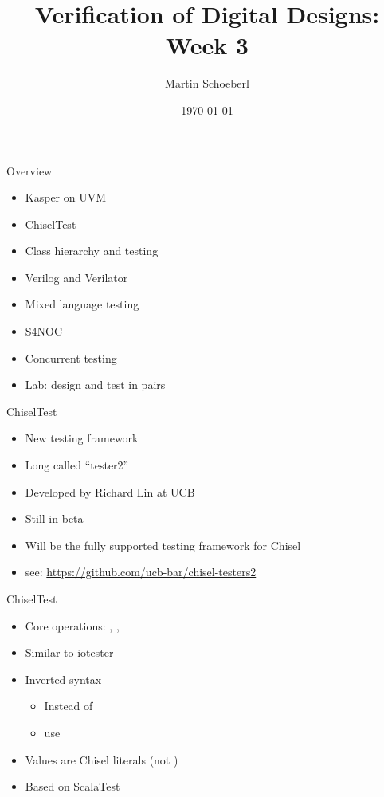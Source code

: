 

\newif\ifbook


\title{Verification of Digital Designs: Week 3}
\author{Martin Schoeberl}
\date{\today}



\begin{frame}
\titlepage
\end{frame}

\begin{frame}[fragile]{Overview}
\begin{itemize}
\item Kasper on UVM
\item ChiselTest
\item Class hierarchy and testing
\item Verilog and Verilator
\item Mixed language testing
\item S4NOC
\item Concurrent testing
\item Lab: design and test in pairs
\end{itemize}
\end{frame}

\begin{frame}[fragile]{ChiselTest}
\begin{itemize}
\item New testing framework
\item Long called ``tester2''
\item Developed by Richard Lin at UCB
\item Still in beta
\item Will be the fully supported testing framework for Chisel
\item see: \url{https://github.com/ucb-bar/chisel-testers2}
\end{itemize}
\end{frame}

\begin{frame}[fragile]{ChiselTest}
\begin{itemize}
\item Core operations: , , 
\item Similar to iotester
\item Inverted syntax
\begin{itemize}
\item Instead of 
\item use 
\end{itemize}
\item Values are Chisel literals (not )
\item Based on ScalaTest
\end{itemize}
\end{frame}



